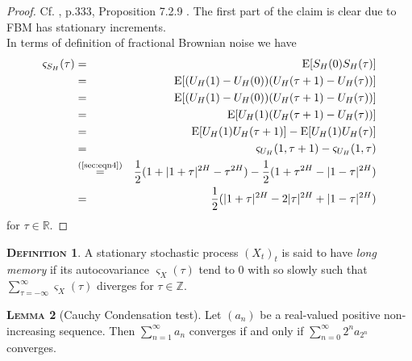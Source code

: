 \documentclass[a4paper, twoside, 11pt]{article}
\theoremstyle{definition}
\newtheorem{definition}{\scshape Definition}[section]
\newtheorem{lemma}[definition]{\scshape Lemma}
\begin{document}
\begin{proof}
  Cf. \cite{nourdin}, p.333, Proposition 7.2.9 . The first part of the claim is clear due to FBM has stationary increments.\\
  In terms of definition of fractional Brownian noise we have
  \begin{eqnarray*}
	\varsigma_{S_H}(\tau) &=& \mathrm{E}[S_H(0)S_H(\tau)] \\
	&=& \mathrm{E}[(U_H(1) - U_H(0))(U_H(\tau+1)-U_H(\tau))]\\
	&=& \mathrm{E}[(U_H(1) - U_H(0))(U_H(\tau+1)-U_H(\tau))]\\
    &=& \mathrm{E}[U_H(1)(U_H(\tau+1)-U_H(\tau))]\\
	&=& \mathrm{E}[U_H(1)U_H(\tau+1)] - \mathrm{E}[U_H(1)U_H(\tau)]\\
	&=& \varsigma_{U_H}(1, \tau+1) - \varsigma_{U_H}(1, \tau)\\
	&\overset{\text{(\ref{sec:eqn4})}}{=}& \frac{1}{2} (1 + |1+\tau|^{2H} - \tau^{2H}) - \frac{1}{2}(1 + \tau^{2H} - |1 - \tau|^{2H})\\
	&=& \frac{1}{2}(|1+\tau|^{2H} - 2|\tau|^{2H} + |1-\tau|^{2H})
  \end{eqnarray*}
  for $\tau \in \mathbb{R}$.
\end{proof}


\begin{definition}
  A stationary stochastic process $(X_t)_t$ is said to have \emph{long memory} if its autocovariance $\varsigma_X(\tau)$ tend to $0$  with so slowly such that
  $ \sum_{\tau = -\infty} ^{\infty} \varsigma_X(\tau)$ diverges for $\tau \in \mathbb{Z}$.
\end{definition}

\begin{lemma}[Cauchy Condensation test]
  Let $(a_n)$ be a real-valued positive non-increasing sequence. Then $\sum_{n=1}^{\infty} a_n$ converges if and only if $\sum_{n=0}^{\infty} 2^n a_{2^n}$ converges.
  \label{sec:cauchy}
\end{lemma}
\end{document}
